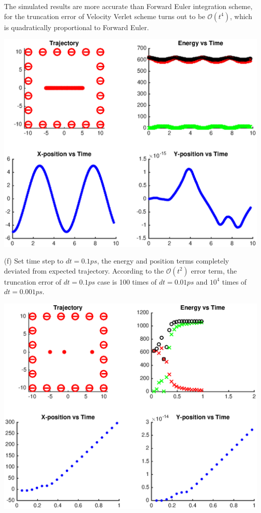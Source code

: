 \documentclass{article}
\begin{document}
The simulated results are more accurate than Forward Euler integration scheme, for the truncation error of Velocity Verlet scheme turns out to be $\mathcal{O}(t^4)$, which is quadratically proportional to Forward Euler.

\vspace{-5mm}
\qquad\quad\includegraphics[scale=0.65]{4.eps}


\noindent
(f) Set time step to $dt=0.1ps$, the energy and position terms completely deviated from expected trajectory. According to the $\mathcal{O}(t^2)$ error term, the truncation error of $dt=0.1ps$ case is 100 times of $dt=0.01ps$ and $10^{4}$ times of $dt=0.001ps$.

\qquad\quad\includegraphics[scale=0.65]{5.eps}
\end{document}
